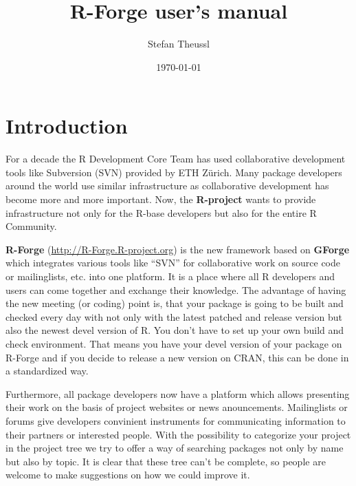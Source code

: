 \documentclass[a4paper]{article}
\title{R-Forge user's manual}
\author{Stefan Theussl}
\date{\today}
\begin{document}
\maketitle


\section{Introduction}
\label{sec:intro}
For a decade the R Development Core Team has used collaborative
development tools like Subversion (SVN) provided by ETH Z\"urich. 
Many package
developers around the world use similar infrastructure as
collaborative development has become more and more important.
Now, the \textbf{R-project} wants to provide infrastructure not only
for the R-base developers but also for the entire R Community.

\textbf{R-Forge} (\url{http://R-Forge.R-project.org}) is the new
framework based on 
\textbf{GForge} which integrates various tools like
``SVN'' for collaborative work on source code or mailinglists,
etc. into one platform. It is a
place where all R developers and users can come together and exchange
their knowledge. The advantage of having the new meeting (or coding)
point is, that your package is going to be built and checked every day
with not only with the latest patched and release version but also the
newest devel version of R. You don't have to set up your own
build and check environment. That means you have your devel version of
your package on R-Forge and if you decide to release a new
version on CRAN, this can be done in a standardized way.

Furthermore, all package developers now have a
platform which allows presenting their work on the basis of project
websites or
news anouncements. Mailinglists or forums give developers convinient
instruments for communicating information to their partners or
interested people.
With the possibility to categorize your project in the project tree we
try to offer a way of searching packages not only by name but also by
topic. It is clear that these tree can't be complete, so people are
welcome to make suggestions on how we could improve it.
 
\end{document}
